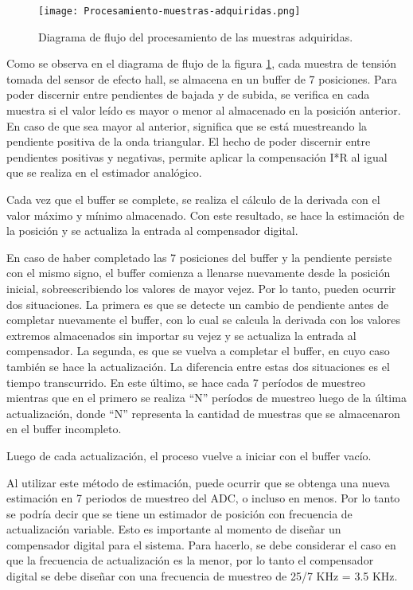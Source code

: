 \begin{figure}[H]
	\centering
	\texttt{[image: Procesamiento-muestras-adquiridas.png]}
	\caption{ Diagrama de flujo del procesamiento de las muestras adquiridas.}
	\label{fig:procesamiento-muestras-adquiridas}
\end{figure}


\noindent Como se observa en el diagrama de flujo de la figura \ref{fig:procesamiento-muestras-adquiridas}, cada muestra de tensión tomada del sensor de efecto hall, se almacena en un buffer de 7 posiciones. Para poder discernir entre pendientes de bajada y de subida, se verifica en cada muestra si el valor leído es mayor o menor al almacenado en la posición anterior. En caso de que sea mayor al anterior, significa que se está muestreando la pendiente positiva de la onda triangular. El hecho de poder discernir entre pendientes positivas y negativas, permite aplicar la compensación I*R al igual que se realiza en el estimador analógico. 

\noindent Cada vez que el buffer se complete, se realiza el cálculo de la derivada con el valor máximo y mínimo almacenado. Con este resultado, se hace la estimación de la posición y se actualiza la entrada al compensador digital.

\noindent En caso de haber completado las 7 posiciones del buffer y la pendiente persiste con el mismo signo, el buffer comienza a llenarse nuevamente desde la posición inicial, sobreescribiendo los valores de mayor vejez. Por lo tanto, pueden ocurrir dos situaciones. La primera es que se detecte un cambio de pendiente antes de completar nuevamente el buffer, con lo cual se calcula la derivada con los valores extremos almacenados sin importar su vejez y se actualiza la entrada al compensador. La segunda, es que se vuelva a completar el buffer, en cuyo caso también se hace la actualización. La diferencia entre estas dos situaciones es el tiempo transcurrido. En este último, se hace cada 7 períodos de muestreo mientras que en el primero se realiza “N” períodos de muestreo luego de la última actualización, donde “N” representa la cantidad de muestras que se almacenaron en el buffer incompleto.

\noindent Luego de cada actualización, el proceso vuelve a iniciar con el buffer vacío.

\noindent Al utilizar este método de estimación, puede ocurrir que se obtenga una nueva estimación en 7 periodos de muestreo del ADC, o incluso en menos. Por lo tanto se podría decir que se tiene un estimador de posición con frecuencia de actualización variable. Esto es importante al momento de diseñar un compensador digital para el sistema. Para hacerlo, se debe considerar el caso en que la frecuencia de actualización es la menor, por lo tanto el compensador digital se debe diseñar con una frecuencia de muestreo de 25/7 KHz = 3.5 KHz.

